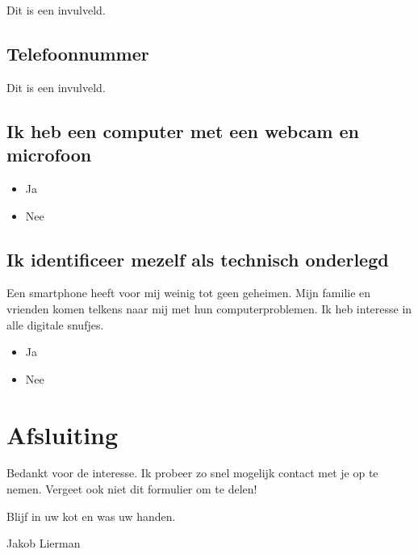 Dit is een invulveld.

\subsection*{Telefoonnummer}

Dit is een invulveld.

\subsection*{Ik heb een computer met een webcam en microfoon}

\begin{itemize}
    \item Ja
    \item Nee
\end{itemize}

\subsection*{Ik identificeer mezelf als technisch onderlegd}

Een smartphone heeft voor mij weinig tot geen geheimen.
Mijn familie en vrienden komen telkens naar mij met hun computerproblemen.
Ik heb interesse in alle digitale snufjes.

\begin{itemize}
    \item Ja
    \item Nee
\end{itemize}

\section{Afsluiting}

Bedankt voor de interesse. Ik probeer zo snel mogelijk contact met je op te nemen. Vergeet ook niet dit formulier om te delen!

Blijf in uw kot en was uw handen. 

Jakob Lierman
